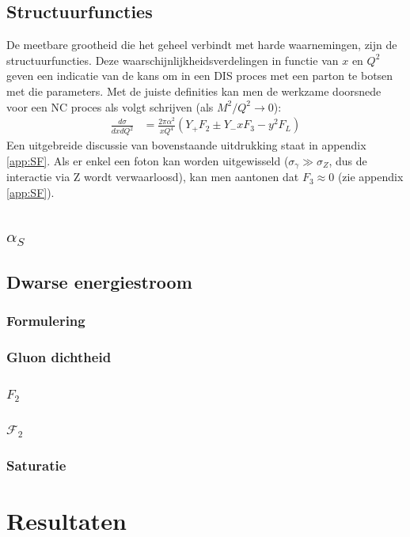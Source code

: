 \documentclass[a4paper,11pt]{article}
\numberwithin{equation}{section} %
\begin{document}
  \subsection{Structuurfuncties}
De meetbare grootheid die het geheel verbindt met harde waarnemingen, zijn de structuurfuncties.
Deze waarschijnlijkheidsverdelingen in functie van $x$ en $Q^2$  geven een indicatie van de kans om in een DIS proces met een parton te botsen met die parameters.
Met de juiste definities kan men de werkzame doorsnede voor een NC proces als volgt schrijven (als $M^2/Q^2 \rightarrow 0$):
\begin{align} \label{eq:SF}
\frac{d\sigma}{dxdQ^2} &= \frac{2\pi \alpha^2}{xQ^4} \left(Y_+ F_2 \pm Y_- x F_3 - y^2 F_L \right)
\end{align}
Een uitgebreide discussie van bovenstaande uitdrukking staat in appendix \ref{app:SF}.
Als er enkel een foton kan worden uitgewisseld ($\sigma_\gamma \gg \sigma_Z$, dus de interactie via Z wordt verwaarloosd), kan men aantonen dat $F_3 \approx 0$ (zie appendix \ref{app:SF}).

  \subsection{$\alpha_S$}

  \subsection{Dwarse energiestroom}
    \subsubsection{Formulering}
    \subsubsection{Gluon dichtheid}
    \subsubsection{$F_2$}
    \subsubsection{$\mathcal{F}_2$}
    \subsubsection{Saturatie}

\section{Resultaten}
\end{document}
